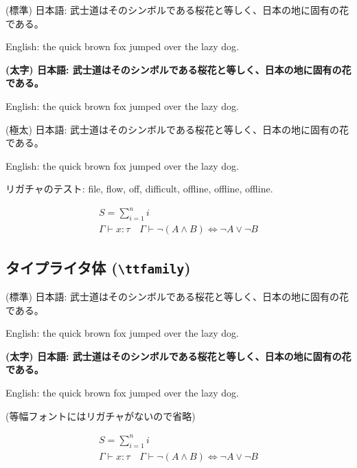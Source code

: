 \documentclass[xelatex,a4paper,ja=standard,jafont=haranoaji]{bxjsarticle}
\newcommand{\jasample}{武士道はそのシンボルである桜花と等しく、日本の地に固有の花である。}
\begin{document}
\sffamily\LARGE

{\mdseries (標準) 日本語: \jasample

English: the quick brown fox jumped over the lazy dog.}

{\bfseries (太字) 日本語: \jasample

English: the quick brown fox jumped over the lazy dog.}

{\ebseries (極太) 日本語: \jasample

English: the quick brown fox jumped over the lazy dog.}

{\mdseries リガチャのテスト: file, flow, off, difficult, offline, off\/line, off\textcompwordmark line.}

\normalsize
\begin{gather*}
    S = \sum_{i=1}^n i \\
    \Gamma \vdash x \colon \tau \quad \Gamma \vdash {\neg(A\land B)} \iff {\neg A} \lor {\neg B}
\end{gather*}

\subsection{タイプライタ体 (\texttt{\textbackslash ttfamily})}

\ttfamily\LARGE

{\mdseries (標準) 日本語: \jasample

English: the quick brown fox jumped over the lazy dog.}

{\bfseries (太字) 日本語: \jasample

English: the quick brown fox jumped over the lazy dog.}

\normalsize
(等幅フォントにはリガチャがないので省略)

\begin{gather*}
    S = \sum_{i=1}^n i \\
    \Gamma \vdash x \colon \tau \quad \Gamma \vdash {\neg(A\land B)} \iff {\neg A} \lor {\neg B}
\end{gather*}
\end{document}
